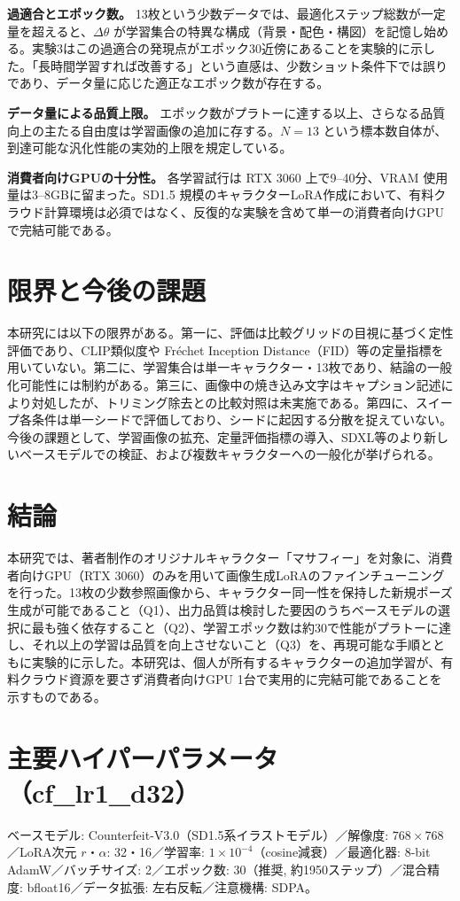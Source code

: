 \documentclass[10pt,twocolumn]{ltjsarticle}
\begin{document}
\textbf{過適合とエポック数。} 13枚という少数データでは、最適化ステップ総数が一定量を超えると、$\Delta\theta$ が学習集合の特異な構成（背景・配色・構図）を記憶し始める。実験3はこの過適合の発現点がエポック30近傍にあることを実験的に示した。「長時間学習すれば改善する」という直感は、少数ショット条件下では誤りであり、データ量に応じた適正なエポック数が存在する。

\textbf{データ量による品質上限。} エポック数がプラトーに達する以上、さらなる品質向上の主たる自由度は学習画像の追加に存する。$N=13$ という標本数自体が、到達可能な汎化性能の実効的上限を規定している。

\textbf{消費者向けGPUの十分性。} 各学習試行は RTX 3060 上で9--40分、VRAM 使用量は3--8GBに留まった。SD1.5 規模のキャラクターLoRA作成において、有料クラウド計算環境は必須ではなく、反復的な実験を含めて単一の消費者向けGPUで完結可能である。

\section{限界と今後の課題}
本研究には以下の限界がある。第一に、評価は比較グリッドの目視に基づく定性評価であり、CLIP類似度や Fréchet Inception Distance（FID）等の定量指標を用いていない。第二に、学習集合は単一キャラクター・13枚であり、結論の一般化可能性には制約がある。第三に、画像中の焼き込み文字はキャプション記述により対処したが、トリミング除去との比較対照は未実施である。第四に、スイープ各条件は単一シードで評価しており、シードに起因する分散を捉えていない。今後の課題として、学習画像の拡充、定量評価指標の導入、SDXL等のより新しいベースモデルでの検証、および複数キャラクターへの一般化が挙げられる。

\section{結論}
本研究では、著者制作のオリジナルキャラクター「マサフィー」を対象に、消費者向けGPU（RTX 3060）のみを用いて画像生成LoRAのファインチューニングを行った。13枚の少数参照画像から、キャラクター同一性を保持した新規ポーズ生成が可能であること（Q1）、出力品質は検討した要因のうちベースモデルの選択に最も強く依存すること（Q2）、学習エポック数は約30で性能がプラトーに達し、それ以上の学習は品質を向上させないこと（Q3）を、再現可能な手順とともに実験的に示した。本研究は、個人が所有するキャラクターの追加学習が、有料クラウド資源を要さず消費者向けGPU 1台で実用的に完結可能であることを示すものである。

\appendix
\section{主要ハイパーパラメータ（cf\_lr1\_d32）}
ベースモデル: Counterfeit-V3.0（SD1.5系イラストモデル）／解像度: $768\times768$／LoRA次元 $r$・$\alpha$: 32・16／学習率: $1\!\times\!10^{-4}$（cosine減衰）／最適化器: 8-bit AdamW／バッチサイズ: 2／エポック数: 30（推奨, 約1950ステップ）／混合精度: bfloat16／データ拡張: 左右反転／注意機構: SDPA。
\end{document}
